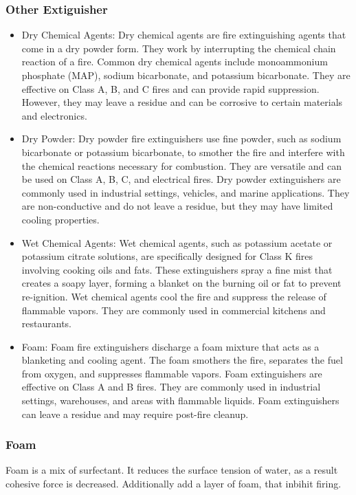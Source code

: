 \documentclass{article}
\begin{document}
\subsubsection*{Other Extiguisher}
\begin{itemize}
  \item Dry Chemical Agents:
  Dry chemical agents are fire extinguishing agents that come in a dry powder form. They work by interrupting the chemical chain reaction of a fire. Common dry chemical agents include monoammonium phosphate (MAP), sodium bicarbonate, and potassium bicarbonate. They are effective on Class A, B, and C fires and can provide rapid suppression. However, they may leave a residue and can be corrosive to certain materials and electronics.
  
  \item Dry Powder:
  Dry powder fire extinguishers use fine powder, such as sodium bicarbonate or potassium bicarbonate, to smother the fire and interfere with the chemical reactions necessary for combustion. They are versatile and can be used on Class A, B, C, and electrical fires. Dry powder extinguishers are commonly used in industrial settings, vehicles, and marine applications. They are non-conductive and do not leave a residue, but they may have limited cooling properties.
  
  \item Wet Chemical Agents:
  Wet chemical agents, such as potassium acetate or potassium citrate solutions, are specifically designed for Class K fires involving cooking oils and fats. These extinguishers spray a fine mist that creates a soapy layer, forming a blanket on the burning oil or fat to prevent re-ignition. Wet chemical agents cool the fire and suppress the release of flammable vapors. They are commonly used in commercial kitchens and restaurants.
  
  \item Foam:
  Foam fire extinguishers discharge a foam mixture that acts as a blanketing and cooling agent. The foam smothers the fire, separates the fuel from oxygen, and suppresses flammable vapors. Foam extinguishers are effective on Class A and B fires. They are commonly used in industrial settings, warehouses, and areas with flammable liquids. Foam extinguishers can leave a residue and may require post-fire cleanup.

\end{itemize}

\subsubsection*{Foam}
Foam is a mix of surfectant. It reduces the surface tension of water, as a result cohesive force is decreased. Additionally add a layer of foam, that inbihit firing. 
\end{document}
